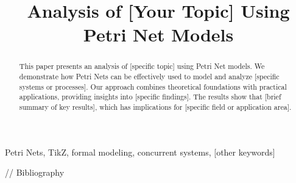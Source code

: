 \documentclass[conference]{IEEEtran}
\begin{document}
\title{Analysis of [Your Topic] Using Petri Net Models}

\author{
}

\maketitle

\begin{abstract}
This paper presents an analysis of [specific topic] using Petri Net models. We demonstrate how Petri Nets can be effectively used to model and analyze [specific systems or processes]. Our approach combines theoretical foundations with practical applications, providing insights into [specific findings]. The results show that [brief summary of key results], which has implications for [specific field or application area].
\end{abstract}

\begin{IEEEkeywords}
Petri Nets, TikZ, formal modeling, concurrent systems, [other keywords]
\end{IEEEkeywords}








// Bibliography


\end{document}
